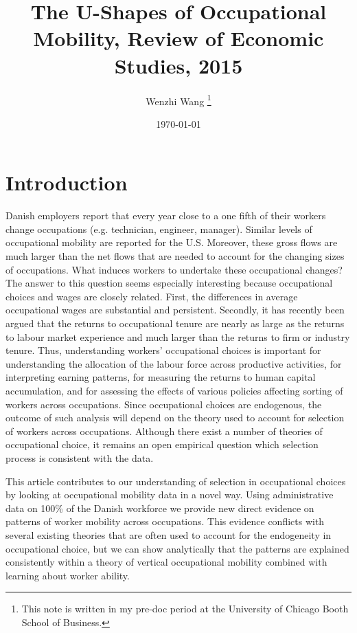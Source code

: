 \documentclass[12pt]{article}
\theoremstyle{definition}
\begin{document}
 


\title{\bf The U-Shapes of Occupational Mobility, Review of Economic Studies, 2015} 
\author{Wenzhi Wang \thanks{This note is written in my pre-doc period at the University of Chicago Booth School of Business.} } 
\date{\today} 
\maketitle 

\citet{groesUShapesOccupationalMobility2015}

\section{Introduction}

Danish employers report that every year close to a one fifth of their workers change occupations (e.g. technician, engineer, manager). Similar levels of occupational mobility are reported for the U.S. Moreover, these gross flows are much larger than the net flows that are needed to account for the changing sizes of occupations. What induces workers to undertake these occupational changes? The answer to this question seems especially interesting because occupational choices and wages are closely related. First, the differences in average occupational wages are substantial and persistent. Secondly, it has recently been argued that the returns to occupational tenure are nearly as large as the returns to labour market experience and much larger than the returns to firm or industry tenure. Thus, understanding workers' occupational choices is important for understanding the allocation of the labour force across productive activities, for interpreting earning patterns, for measuring the returns to human capital accumulation, and for assessing the effects of various policies affecting sorting of workers across occupations. Since occupational choices are endogenous, the outcome of such analysis will depend on the theory used to account for selection of workers across occupations. Although there exist a number of theories of occupational choice, it remains an open empirical question which selection process is consistent with the data.

This article contributes to our understanding of selection in occupational choices by looking at occupational mobility data in a novel way. Using administrative data on 100\% of the Danish workforce we provide new direct evidence on patterns of worker mobility across occupations. This evidence conflicts with several existing theories that are often used to account for the endogeneity in occupational choice, but we can show analytically that the patterns are explained consistently within a theory of vertical occupational mobility combined with learning about worker ability.
\end{document}
